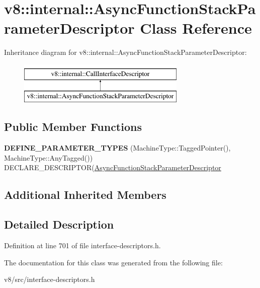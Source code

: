 \hypertarget{classv8_1_1internal_1_1AsyncFunctionStackParameterDescriptor}{}\section{v8\+:\+:internal\+:\+:Async\+Function\+Stack\+Parameter\+Descriptor Class Reference}
\label{classv8_1_1internal_1_1AsyncFunctionStackParameterDescriptor}
Inheritance diagram for v8\+:\+:internal\+:\+:Async\+Function\+Stack\+Parameter\+Descriptor\+:\begin{figure}[H]
\begin{center}
\leavevmode
\includegraphics[height=2.000000cm]{classv8_1_1internal_1_1AsyncFunctionStackParameterDescriptor}
\end{center}
\end{figure}
\subsection*{Public Member Functions}
\begin{DoxyCompactItemize}
\item 
\mbox{\label{classv8_1_1internal_1_1AsyncFunctionStackParameterDescriptor_a28dad241e1ee989a522460180a4d24a0}} 
{\bfseries D\+E\+F\+I\+N\+E\+\_\+\+P\+A\+R\+A\+M\+E\+T\+E\+R\+\_\+\+T\+Y\+P\+ES} (Machine\+Type\+::\+Tagged\+Pointer(), Machine\+Type\+::\+Any\+Tagged()) D\+E\+C\+L\+A\+R\+E\+\_\+\+D\+E\+S\+C\+R\+I\+P\+T\+OR(\mbox{\hyperlink{classv8_1_1internal_1_1AsyncFunctionStackParameterDescriptor}{Async\+Function\+Stack\+Parameter\+Descriptor}}
\end{DoxyCompactItemize}
\subsection*{Additional Inherited Members}


\subsection{Detailed Description}


Definition at line 701 of file interface-\/descriptors.\+h.



The documentation for this class was generated from the following file\+:\begin{DoxyCompactItemize}
\item 
v8/src/interface-\/descriptors.\+h\end{DoxyCompactItemize}
